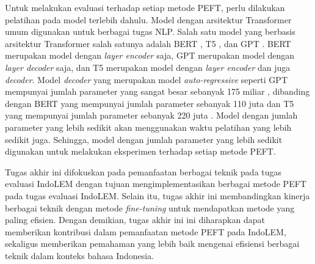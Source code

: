 Untuk melakukan evaluasi terhadap setiap metode PEFT, perlu dilakukan pelatihan pada model terlebih dahulu. Model dengan arsitektur Transformer umum digunakan untuk berbagai tugas NLP. Salah satu model yang berbasis arsitektur Transformer salah satunya adalah BERT \parencite{bert}, T5 \parencite{T5}, dan GPT \parencite{gpt}. BERT merupakan model dengan \textit{layer encoder} saja, GPT merupakan model dengan \textit{layer decoder} saja, dan T5 merupakan model dengan \textit{layer encoder} dan juga \textit{decoder}. Model \textit{decoder} yang merupakan model \textit{auto-regressive} seperti GPT mempunyai jumlah parameter yang sangat besar sebanyak 175 miliar \parencite{gpt}, dibanding dengan BERT yang mempunyai jumlah parameter sebanyak 110 juta \parencite{bert} dan T5 yang mempunyai jumlah parameter sebanyak 220 juta \parencite{T5}. Model dengan jumlah parameter yang lebih sedikit akan menggunakan waktu pelatihan yang lebih sedikit juga. Sehingga, model dengan jumlah parameter yang lebih sedikit digunakan untuk melakukan eksperimen terhadap setiap metode PEFT.

Tugas akhir ini  difokuskan pada pemanfaatan berbagai teknik \PEFT pada tugas evaluasi IndoLEM dengan tujuan mengimplementasikan berbagai metode PEFT pada tugas evaluasi IndoLEM. Selain itu, tugas akhir ini  membandingkan kinerja berbagai teknik \PEFT dengan metode \textit{fine-tuning}  untuk mendapatkan metode yang paling efisien. Dengan demikian, tugas akhir ini ini diharapkan dapat memberikan kontribusi dalam pemanfaatan metode PEFT pada IndoLEM, sekaligus memberikan pemahaman yang lebih baik mengenai efisiensi berbagai teknik \PEFT dalam konteks bahasa Indonesia.
